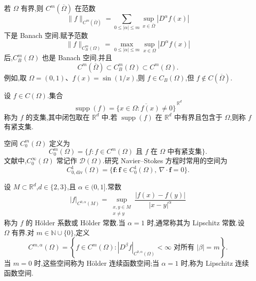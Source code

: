\begin{note}[连续可微函数空间]\label{note:appendix-a-22}
若 $\Omega$ 有界,则 $C^m(\overline\Omega)$ 在范数
\[
 \|f\|_{C^m(\overline\Omega)}=
 \sum_{0\le |\alpha|\le m}\sup_{x\in\overline\Omega}|D^\alpha f(x)|
\]
下是 Banach 空间.赋予范数
\[
 \|f\|_{C_B^m(\Omega)}=
 \max_{0\le |\alpha|\le m}\sup_{x\in\Omega}|D^\alpha f(x)|
\]
后,$C_B^m(\Omega)$ 也是 Banach 空间.并且
\[
 C^m(\overline\Omega)\subset C_B^m(\Omega)\subset C^m(\Omega).
\]
例如,取 $\Omega=(0,1)$、$f(x)=\sin(1/x)$,则 $f\in C_B(\Omega)$,但 $f\notin C(\overline\Omega)$.
\end{note}

\begin{definition}[支集]\label{def:appendix-a-23}
设 $f\in C(\Omega)$.集合
\[
 \operatorname{supp}(f)=\overline{\{x\in\Omega:f(x)\ne0\}}^{\,\mathbb R^d}
\]
称为 $f$ 的支集,其中闭包取在 $\mathbb R^d$ 中.若 $\operatorname{supp}(f)$ 在 $\mathbb R^d$ 中有界且包含于 $\Omega$,则称 $f$ 有紧支集.
\end{definition}

\begin{definition}[空间 $C_0^m(\Omega)$]\label{def:appendix-a-24}
空间 $C_0^m(\Omega)$ 定义为
\[
 C_0^m(\Omega)=\{f:f\in C^m(\Omega)\text{ 且 }f\text{ 在 }\Omega\text{ 中有紧支集}\}.
\]
文献中,$C_0^\infty(\Omega)$ 常记作 $\mathcal D(\Omega)$.研究 Navier--Stokes 方程时常用的空间为
\begin{equation}\label{eq:appendix-a-7}
 C_{0,\mathrm{div}}^1(\Omega)=\{\bm f:\bm f\in C_0^1(\Omega),\ \nabla\cdot\bm f=0\}.
\end{equation}
\end{definition}

\begin{definition}\label{def:appendix-a-25}
设 $M\subset\mathbb R^d$,$d\in\{2,3\}$,且 $\alpha\in(0,1]$.常数
\[
 |f|_{C^{0,\alpha}(M)}=
 \sup_{\substack{x,y\in M\\x\ne y}}\frac{|f(x)-f(y)|}{|x-y|^\alpha}
\]
称为 $f$ 的 Hölder 系数或 Hölder 常数.当 $\alpha=1$ 时,通常称其为 Lipschitz 常数.设 $\Omega$ 有界.对 $m\in\mathbb N\cup\{0\}$,定义
\[
 C^{m,\alpha}(\Omega)=\left\{f\in C^m(\Omega):
 |D^\beta f|_{C^{0,\alpha}(\Omega)}<\infty\text{ 对所有 }|\beta|=m\right\}.
\]
当 $m=0$ 时,这些空间称为 Hölder 连续函数空间;当 $\alpha=1$ 时,称为 Lipschitz 连续函数空间.
\end{definition}

